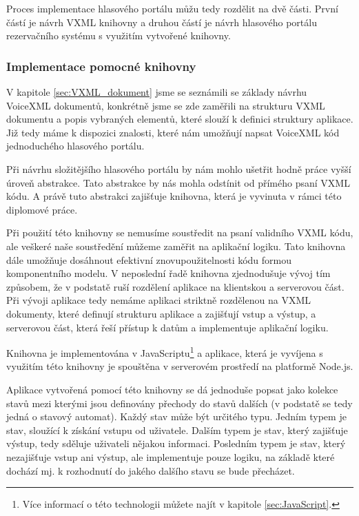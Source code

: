 \documentclass[ing,male,java,dept460,twoside]{diploma}						%
\begin{document}
Proces implementace hlasového portálu můžu tedy rozdělit na dvě části. První částí je návrh VXML knihovny a druhou částí je návrh hlasového portálu rezervačního systému s využitím vytvořené knihovny.

\subsubsection{Implementace pomocné knihovny}

V kapitole \ref{sec:VXML_dokument} jsme se seznámili se základy návrhu VoiceXML dokumentů, konkrétně jsme se zde zaměřili na strukturu VXML dokumentu a popis vybraných elementů, které slouží k definici struktury aplikace. Již tedy máme k dispozici znalosti, které nám umožňují napsat VoiceXML kód jednoduchého hlasového portálu.

Při návrhu složitějšího hlasového portálu by nám mohlo ušetřit hodně práce vyšší úroveň abstrakce. Tato abstrakce by nás mohla odstínit od přímého psaní VXML kódu. A právě tuto abstrakci zajišťuje knihovna, která je vyvinuta v rámci této diplomové práce.

Při použití této knihovny se nemusíme soustředit na psaní validního VXML kódu, ale veškeré naše soustředění můžeme zaměřit na aplikační logiku. Tato knihovna dále umožňuje dosáhnout efektivní znovupoužitelnosti kódu formou komponentního modelu. V neposlední řadě knihovna zjednodušuje vývoj tím způsobem, že v podstatě ruší rozdělení aplikace na klientskou a serverovou část. Při vývoji aplikace tedy nemáme aplikaci striktně rozdělenou na VXML dokumenty, které definují strukturu aplikace a zajišťují vstup a výstup, a serverovou část, která řeší přístup k datům a implementuje aplikační logiku.

Knihovna je implementována v JavaScriptu\footnote{Více informací o této technologii můžete najít v kapitole \ref{sec:JavaScript}.} a aplikace, která je vyvíjena s využitím této knihovny je spouštěna v serverovém prostředí na platformě Node.js.

Aplikace vytvořená pomocí této knihovny se dá jednoduše popsat jako kolekce stavů mezi kterými jsou definovány přechody do stavů dalších (v podstatě se tedy jedná o stavový automat). Každý stav může být určitého typu. Jedním typem je stav, sloužící k získání vstupu od uživatele. Dalším typem je stav, který zajišťuje výstup, tedy sděluje uživateli nějakou informaci. Posledním typem je stav, který nezajišťuje vstup ani výstup, ale implementuje pouze logiku, na základě které dochází mj. k rozhodnutí do jakého dalšího stavu se bude přecházet.
\end{document}
